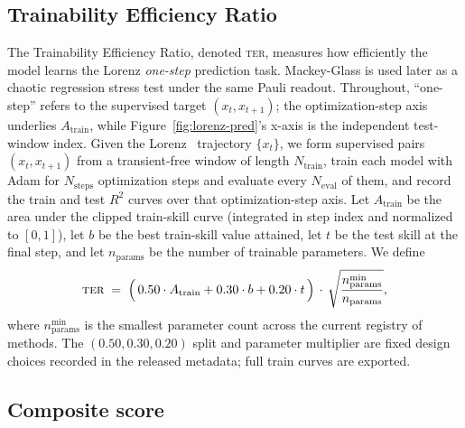 \documentclass{article}
\newcommand{\ter}{\textsc{ter}}
\begin{document}
\subsection{Trainability Efficiency Ratio}
\label{sec:ter-definition}

The Trainability Efficiency Ratio, denoted \ter, measures how efficiently the model learns the Lorenz \emph{one-step} prediction task.
Mackey-Glass is used later as a chaotic regression stress test under the same Pauli readout.
Throughout, ``one-step'' refers to the supervised target $(x_t, x_{t+1})$; the optimization-step axis underlies $A_{\mathrm{train}}$, while Figure~\ref{fig:lorenz-pred}'s x-axis is the independent test-window index.
Given the Lorenz~\citep{lorenz1963} trajectory $\{x_t\}$, we form supervised pairs $(x_t, x_{t+1})$ from a transient-free window of length $N_{\mathrm{train}}$, train each model with Adam for $N_{\mathrm{steps}}$ optimization steps and evaluate every $N_{\mathrm{eval}}$ of them, and record the train and test $R^2$ curves over that optimization-step axis.
Let $A_{\mathrm{train}}$ be the area under the clipped train-skill curve (integrated in step index and normalized to $[0, 1]$), let $b$ be the best train-skill value attained, let $t$ be the test skill at the final step, and let $n_{\mathrm{params}}$ be the number of trainable parameters.
We define
\begin{equation}
    \ter
    \;=\;
    \Bigl(\,
        0.50 \cdot A_{\mathrm{train}}
        +
        0.30 \cdot b
        +
        0.20 \cdot t
    \,\Bigr)
    \,\cdot\,
    \sqrt{\frac{n_{\mathrm{params}}^{\min}}{n_{\mathrm{params}}}},
    \label{eq:ter-formula}
\end{equation}
where $n_{\mathrm{params}}^{\min}$ is the smallest parameter count across the current registry of methods.
The $(0.50, 0.30, 0.20)$ split and parameter multiplier are fixed design choices recorded in the released metadata; full train curves are exported.

\subsection{Composite score}
\label{sec:nlps-definition}
\end{document}
